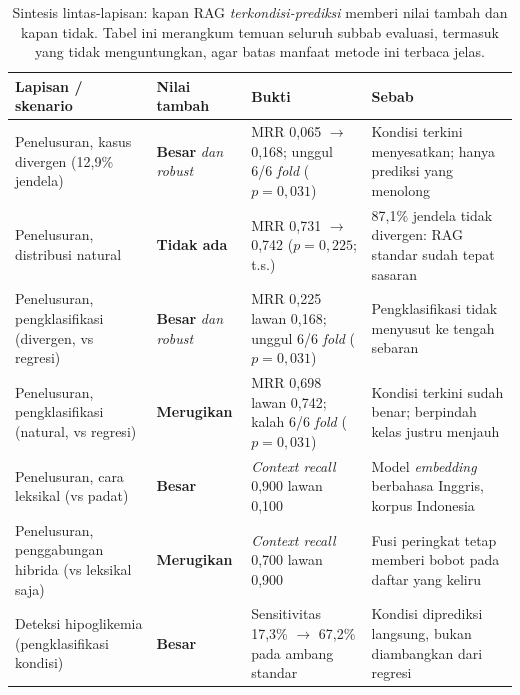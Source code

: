 \begin{table}[p]
\centering
\caption{Sintesis lintas-lapisan: kapan RAG \emph{terkondisi-prediksi} memberi nilai tambah dan kapan tidak. Tabel ini merangkum temuan seluruh subbab evaluasi, termasuk yang tidak menguntungkan, agar batas manfaat metode ini terbaca jelas.}
\label{tab:sintesis}
\footnotesize
\begin{tabularx}{\textwidth}{@{}LlLL@{}}
\toprule
\textbf{Lapisan / skenario} & \textbf{Nilai tambah} & \textbf{Bukti} & \textbf{Sebab} \\
\midrule
Penelusuran, kasus divergen (12,9\% jendela) & \textbf{Besar} \emph{dan robust} & MRR 0,065 $\rightarrow$ 0,168; unggul 6/6 \emph{fold} ($p=0{,}031$) & Kondisi terkini menyesatkan; hanya prediksi yang menolong \\
\addlinespace
Penelusuran, distribusi natural & \textbf{Tidak ada} & MRR 0,731 $\rightarrow$ 0,742 ($p=0{,}225$; t.s.) & 87,1\% jendela tidak divergen: RAG standar sudah tepat sasaran \\
\addlinespace
Penelusuran, pengklasifikasi (divergen, vs regresi) & \textbf{Besar} \emph{dan robust} & MRR 0,225 lawan 0,168; unggul 6/6 \emph{fold} ($p=0{,}031$) & Pengklasifikasi tidak menyusut ke tengah sebaran \\
\addlinespace
Penelusuran, pengklasifikasi (natural, vs regresi) & \textbf{Merugikan} & MRR 0,698 lawan 0,742; kalah 6/6 \emph{fold} ($p=0{,}031$) & Kondisi terkini sudah benar; berpindah kelas justru menjauh \\
\addlinespace
Penelusuran, cara leksikal (vs padat) & \textbf{Besar} & \emph{Context recall} 0,900 lawan 0,100 & Model \emph{embedding} berbahasa Inggris, korpus Indonesia \\
\addlinespace
Penelusuran, penggabungan hibrida (vs leksikal saja) & \textbf{Merugikan} & \emph{Context recall} 0,700 lawan 0,900 & Fusi peringkat tetap memberi bobot pada daftar yang keliru \\
\midrule
Deteksi hipoglikemia (pengklasifikasi kondisi) & \textbf{Besar} & Sensitivitas 17,3\% $\rightarrow$ 67,2\% pada ambang standar & Kondisi diprediksi langsung, bukan diambangkan dari regresi \\

\end{tabularx}
\end{table}
